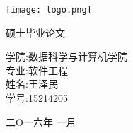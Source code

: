 
\clearpage

\pagestyle{empty}

\texttt{[image: logo.png]}

\begin{center}
\bfseries

\Huge

硕士毕业论文

\vspace{2em}

\Large
学院:数据科学与计算机学院\\
专业:软件工程\\
姓名:王泽民\\
学号:15214205\\


\vspace{3em}
\Large



二O一六年 一月

\end{center}